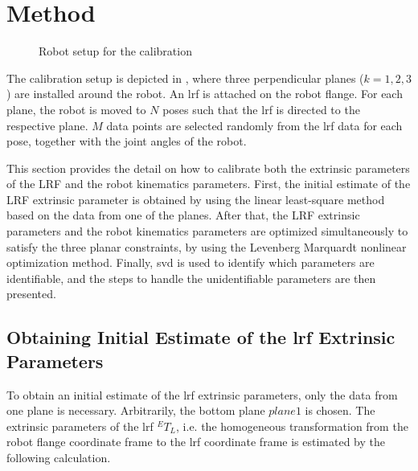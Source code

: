 \section{Method}
\label{sec:method}
\begin{figure}[t]
  \centering
  \vspace*{2mm}
  \caption{Robot setup for the calibration}
  \label{fig:robot_setup}
\end{figure}

The calibration setup is depicted in , where three perpendicular planes ($k=1,2,3$) are installed around the robot. An \ac{lrf} is attached on the robot flange. For each plane, the robot is moved to $N$ poses such that the \ac{lrf} is directed to the respective plane. $M$ data points are selected randomly from the \ac{lrf} data for each pose, together with the joint angles of the robot. 

This section provides the detail on how to calibrate both the extrinsic parameters of the LRF and the robot kinematics parameters. First, the initial estimate of the LRF extrinsic parameter is obtained by using the linear least-square method based on the data from one of the planes. After that, the LRF extrinsic parameters and the robot kinematics parameters are optimized simultaneously to satisfy the three planar constraints, by using the Levenberg Marquardt nonlinear optimization method. Finally, \ac{svd} is used to identify which parameters are identifiable, and the steps to handle the unidentifiable parameters are then presented. 
\subsection{Obtaining Initial Estimate of the \ac{lrf} Extrinsic Parameters}
\label{sec:first_step}
To obtain an initial estimate of the \ac{lrf} extrinsic parameters, only the data from one plane is necessary. Arbitrarily, the bottom plane $plane 1$ is chosen. The extrinsic parameters of the \ac{lrf} ${^E}T_L$, i.e. the homogeneous transformation from the robot flange coordinate frame to the \ac{lrf} coordinate frame is estimated by the following calculation. 

